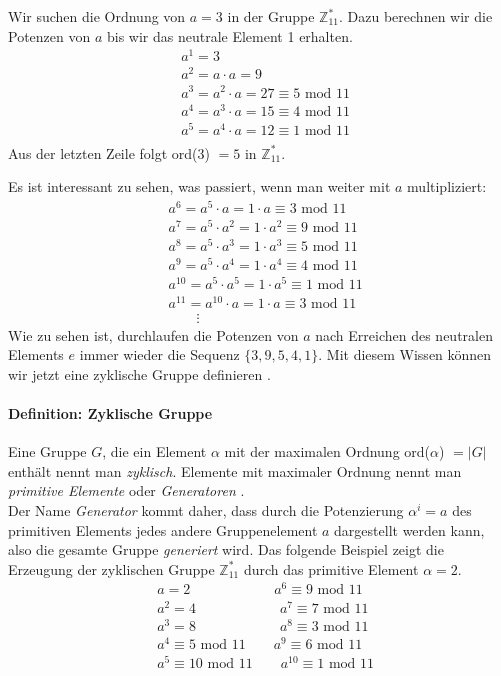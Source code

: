 Wir suchen die Ordnung von $a=3$ in der Gruppe $\mathbb{Z}^*_{11}$. Dazu berechnen wir die Potenzen von $a$ bis wir das neutrale Element 1 erhalten.
\begin{align*}
&a^1 = 3 \\
&a^2 = a \cdot a = 9\\
&a^3 = a^2 \cdot a =  27 \equiv 5 \text{ mod } 11\\
&a^4 = a^3 \cdot a =  15 \equiv 4 \text{ mod } 11\\
&a^5 = a^4 \cdot a =  12 \equiv 1 \text{ mod } 11\\
\end{align*}
Aus der letzten Zeile folgt ord(3) $= 5$ in $\mathbb{Z}^*_{11}$.

Es ist interessant zu sehen, was passiert, wenn man weiter mit $a$ multipliziert:
\begin{align*}
&a^6 = a^5 \cdot a = 1 \cdot a \equiv 3 \text{ mod } 11\\
&a^7 = a^5 \cdot a^2 = 1 \cdot a^2 \equiv 9 \text{ mod } 11\\
&a^8 = a^5 \cdot a^3 = 1 \cdot a^3 \equiv 5 \text{ mod } 11\\
&a^9 = a^5 \cdot a^4 = 1 \cdot a^4 \equiv 4 \text{ mod } 11\\
&a^{10} = a^5 \cdot a^5 = 1 \cdot a^5 \equiv 1 \text{ mod } 11\\
&a^{11} = a^{10} \cdot a = 1 \cdot a \equiv 3 \text{ mod } 11\\
&\qquad \vdots
\end{align*}
Wie zu sehen ist, durchlaufen die Potenzen von $a$ nach Erreichen des neutralen Elements $e$ immer wieder die Sequenz $\{3,9,5,4,1\}$. Mit diesem Wissen können wir jetzt eine zyklische Gruppe definieren \cite[S. 241, 242]{Paar.2016}.

\paragraph{Definition: Zyklische Gruppe}
Eine Gruppe $G$, die ein Element $\alpha$ mit der maximalen Ordnung ord($\alpha$) $= |G|$ enthält nennt man \textit{zyklisch}. Elemente mit maximaler Ordnung nennt man \textit{primitive Elemente} oder \textit{Generatoren} \cite[S. 242]{Paar.2016}.\\

Der Name \textit{Generator} kommt daher, dass durch die Potenzierung $\alpha^i = a$ des primitiven Elements jedes andere Gruppenelement $a$ dargestellt werden kann, also die gesamte Gruppe \textit{generiert} wird. Das folgende Beispiel zeigt die Erzeugung der zyklischen Gruppe $\mathbb{Z}^*_{11}$ durch das primitive Element $\alpha = 2$.
\begin{align*}
&a = 2 \qquad \qquad \qquad a^6 \equiv 9 \text{ mod } 11\\
&a^2 = 4 \qquad \qquad \qquad a^7 \equiv 7 \text{ mod } 11\\
&a^3 = 8 \qquad \qquad \qquad a^8 \equiv 3 \text{ mod } 11\\
&a^4 \equiv 5 \text{ mod } 11 \qquad a^9 \equiv 6 \text{ mod } 11\\
&a^5 \equiv 10 \text{ mod } 11 \qquad a^{10} \equiv 1 \text{ mod } 11\\
\end{align*}

